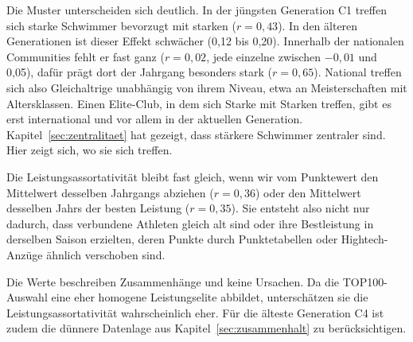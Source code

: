 Die Muster unterscheiden sich deutlich. In der jüngsten Generation C1
treffen sich starke Schwimmer bevorzugt mit starken ($r = 0{,}43$). In den
älteren Generationen ist dieser Effekt schwächer (0,12 bis 0,20). Innerhalb
der nationalen Communities fehlt er fast ganz ($r = 0{,}02$, jede einzelne
zwischen $-0{,}01$ und 0,05), dafür prägt dort der Jahrgang besonders stark
($r = 0{,}65$). National treffen sich also Gleichaltrige unabhängig von
ihrem Niveau, etwa an Meisterschaften mit Altersklassen. Einen Elite-Club,
in dem sich Starke mit Starken treffen, gibt es erst international und vor
allem in der aktuellen Generation. Kapitel~\ref{sec:zentralitaet} hat
gezeigt, dass stärkere Schwimmer zentraler sind. Hier zeigt sich, wo sie
sich treffen.

Die Leistungsassortativität bleibt fast gleich, wenn wir vom Punktewert den
Mittelwert desselben Jahrgangs abziehen ($r = 0{,}36$) oder den Mittelwert
desselben Jahrs der besten Leistung ($r = 0{,}35$). Sie entsteht also
nicht nur dadurch, dass verbundene Athleten gleich alt sind oder ihre
Bestleistung in derselben Saison erzielten, deren Punkte durch
Punktetabellen oder Hightech-Anzüge ähnlich verschoben sind.

Die Werte beschreiben Zusammenhänge und keine Ursachen. Da die
TOP100-Auswahl eine eher homogene Leistungselite abbildet, unterschätzen
sie die Leistungsassortativität wahrscheinlich eher. Für die älteste Generation C4 ist
zudem die dünnere Datenlage aus Kapitel~\ref{sec:zusammenhalt} zu
berücksichtigen.
